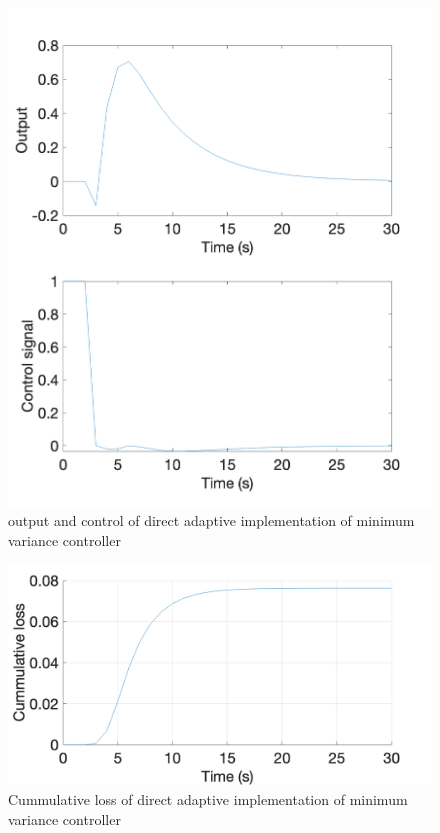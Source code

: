 \begin{figure}
	\centering
	\includegraphics[width=\textwidth]{images/sstr41.png}
	\caption{output and control of direct adaptive implementation of minimum variance controller}
	\label{fig:sstr41}
\end{figure}

\begin{figure}
	\centering
	\includegraphics[width=\textwidth]{images/sstr42.png}
	\caption{Cummulative loss of direct adaptive implementation of minimum variance controller}
	\label{fig:sstr42}
\end{figure}

